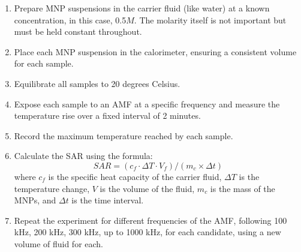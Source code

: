 \documentclass[12pt]{article}
\numberwithin{equation}{section}
\numberwithin{equation}{section}
\begin{document}
\begin{enumerate}
    \item Prepare MNP suspensions in the carrier fluid (like water) at a known concentration, in this case, 0.5$M$. The molarity itself is not important but must be held constant throughout.
    \item Place each MNP suspension in the calorimeter, ensuring a consistent volume for each sample.
    \item Equilibrate all samples to 20 degrees Celsius.
    \item Expose each sample to an AMF at a specific frequency and measure the temperature rise over a fixed interval of 2 minutes.
    \item Record the maximum temperature reached by each sample.
    \item Calculate the SAR using the formula: 
    \begin{equation}
         SAR = (c_{f} \cdot \Delta T \cdot V_f) / (m_c × \Delta t)
    \end{equation}
    where $c_f$ is the specific heat capacity of the carrier fluid, $\Delta T$ is the temperature change, $V$ is the volume of the fluid, $m_c$ is the mass of the MNPs, and $\Delta t$ is the time interval.
    \item Repeat the experiment for different frequencies of the AMF, following 100 kHz, 200 kHz, 300 kHz, up to 1000 kHz, for each candidate, using a new volume of fluid for each.
\end{enumerate}
\end{document}
